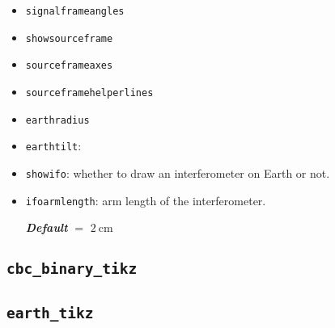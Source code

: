 \documentclass[
    DIV=11,
    BCOR=0mm,
    paper=a4,
    fontsize=11pt,
    twoside=false,
    titlepage=true
]{scrartcl}
\newcommand{\code}[1]{\textcolor{codecolor}{\texttt{#1}}}
\newcommand{\defaultval}[1]{%
    {\bfseries\slshape%
    Default} $=$ #1%
}
\begin{document}
\begin{itemize}
    \item \code{signalframeangles}


    \item \code{showsourceframe}


    \item \code{sourceframeaxes}


    \item \code{sourceframehelperlines}


    \item \code{earthradius}


    \item \code{earthtilt}: 


    \item \code{showifo}: whether to draw an interferometer on Earth or not.


    \item \code{ifoarmlength}: arm length of the interferometer.
    
    \defaultval{$\SI{2}{\centi\metre}$}
\end{itemize}


        \subsection{\texttt{cbc\_binary\_tikz}}


        \subsection{\texttt{earth\_tikz}}
\end{document}
